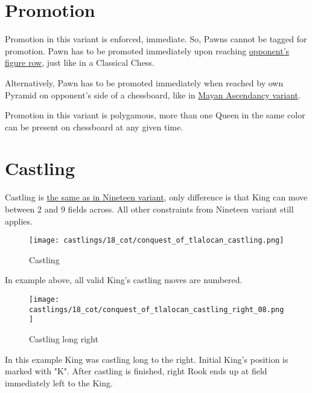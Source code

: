 \clearpage %

\section*{Promotion}
\label{sec:Conquest of Tlalocan/Promotion}

Promotion in this variant is enforced, immediate. So, Pawns cannot be tagged
for promotion. Pawn has to be promoted immediately upon reaching
\hyperref[sec:Terms/Figure row]{opponent's figure row},
just like in a Classical Chess.

Alternatively, Pawn has to be promoted immediately when reached by own Pyramid
on opponent's side of a chessboard, like in
\hyperref[sec:Mayan Ascendancy/Pyramid/Promotion]{Mayan Ascendancy variant}.

Promotion in this variant is polygamous, more than one Queen in the same color
can be present on chessboard at any given time.

\clearpage %

\section*{Castling}
\label{sec:Conquest of Tlalocan/Castling}

Castling is
\hyperref[sec:Nineteen/Castling]{the same as in Nineteen variant},
only difference is that King can move
between 2 and 9 fields across. All other constraints from Nineteen variant still
applies.

\noindent
\begin{figure}[!h]
\texttt{[image: castlings/18\_cot/conquest\_of\_tlalocan\_castling.png]}
\caption{Castling}
\label{fig:conquest_of_tlalocan_castling}
\end{figure}

In example above, all valid King's castling moves are numbered.

\noindent
\begin{figure}[!h]
\texttt{[image: castlings/18\_cot/conquest\_of\_tlalocan\_castling\_right\_08.png]}
\caption{Castling long right}
\label{fig:conquest_of_tlalocan_castling_right_08}
\end{figure}

In this example King was castling long to the right. Initial King's position
is marked with "K". After castling is finished, right Rook ends up at field
immediately left to the King.

